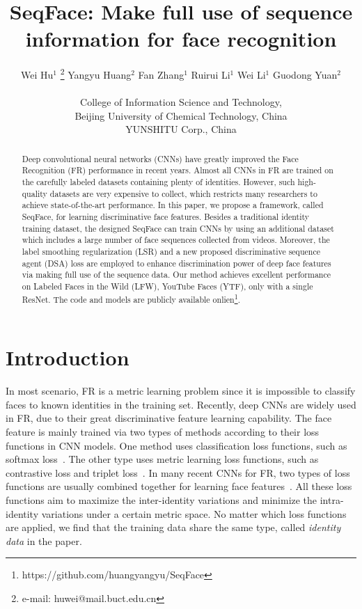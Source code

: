 \documentclass[conference]{acmsiggraph}
\title{SeqFace: Make full use of sequence information for face recognition}
\author{
\vspace{1mm} Wei Hu$^1$            \thanks{e-mail: huwei@mail.buct.edu.cn}
\hspace{8mm} Yangyu Huang$^2$
\hspace{8mm} Fan Zhang$^1$
\hspace{8mm} Ruirui Li$^1$
\hspace{8mm} Wei Li$^1$
\hspace{8mm} Guodong Yuan$^2$
\\
\begin{minipage}{8.5cm} \center College of Information Science and Technology, \\ Beijing University of Chemical Technology, China \end{minipage}\hspace{0.2cm}
\begin{minipage}{8.5cm} \center YUNSHITU Corp., China \end{minipage}\hspace{0.2cm}
\vspace{-3mm} }
\begin{document}
\maketitle

\begin{abstract}
Deep convolutional neural networks (CNNs) have greatly improved the Face Recognition (FR) performance in recent years. Almost all CNNs in FR are trained on the carefully labeled datasets containing plenty of identities. However, such high-quality datasets are very expensive to collect, which restricts many researchers to achieve state-of-the-art performance. In this paper, we propose a framework, called SeqFace, for learning discriminative face features. Besides a traditional identity training dataset, the designed SeqFace can train CNNs by using an additional dataset which includes a large number of face sequences collected from videos. Moreover, the label smoothing regularization (LSR) and a new proposed discriminative sequence agent (DSA) loss are employed to enhance discrimination power of deep face features via making full use of the sequence data. Our method achieves excellent performance on Labeled Faces in the Wild (LFW), YouTube Faces (YTF), only with a single ResNet. The code and models are publicly available onlien\footnote{https://github.com/huangyangyu/SeqFace}.
\end{abstract}



\keywordlist



\TOGlinkslist



\copyrightspace


\section{Introduction}
\label{sec:Introduction}

In most scenario, FR is a metric learning problem since it is impossible to classify faces to known identities in the training set. Recently, deep CNNs are widely used in FR, due to their great discriminative feature learning capability. The face feature is mainly trained via two types of methods according to their loss functions in CNN models. One method uses classification loss functions, such as softmax loss~\cite{deepface,frbyclass1,frbyclass2}. The other type uses metric learning loss functions, such as contrastive loss and triplet loss~\cite{tripletloss,contrastiveloss}. In many recent CNNs for FR, two types of loss functions are usually combined together for learning face features~\cite{centerloss}. All these loss functions aim to maximize the inter-identity variations and minimize the intra-identity variations under a certain metric space. No matter which loss functions are applied, we find that the training data share the same type, called \emph{identity data} in the paper.
\end{document}
